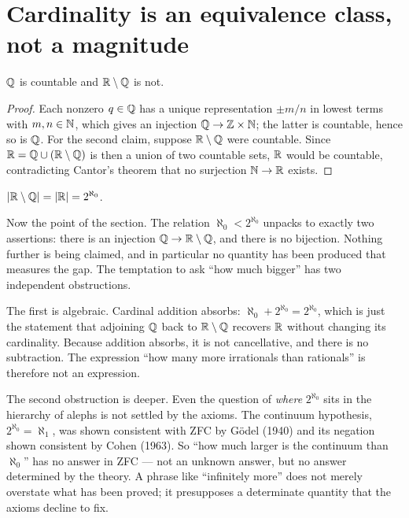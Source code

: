 \documentclass{essay}
\newcommand{\Irr}{\R \setminus \Q}
\begin{document}
\section{Cardinality is an equivalence class, not a magnitude}
\label{sec:card}

\begin{theorem}
  \(\mathbb{Q}\) is countable and \(\Irr\) is not.
\end{theorem}

\begin{proof}
  Each nonzero \(q \in \mathbb{Q}\) has a unique representation \(\pm m/n\) in lowest
  terms with \(m, n \in \mathbb{N}\), which gives an injection \(\mathbb{Q} \to \mathbb{Z} \times
  \mathbb{N}\); the latter is countable, hence so is \(\mathbb{Q}\). For the second claim,
  suppose \(\Irr\) were countable. Since \(\R = \Q \cup (\Irr)\) is then a
  union of two countable sets, \(\mathbb{R}\) would be countable, contradicting
  Cantor's theorem that no surjection \(\mathbb{N} \to \mathbb{R}\) exists.
\end{proof}

\begin{corollary}
  \(|\Irr| = |\R| = 2^{\aleph_{0}}\).
\end{corollary}

Now the point of the section. The relation \(\aleph_{0} < 2^{\aleph_{0}}\)
unpacks to exactly two assertions: there is an injection \(\Q \to \Irr\),
and there is no bijection. Nothing further is being claimed, and in
particular no quantity has been produced that measures the gap. The
temptation to ask ``how much bigger'' has two independent obstructions.

The first is algebraic. Cardinal addition absorbs: \(\aleph_{0} +
2^{\aleph_{0}} = 2^{\aleph_{0}}\), which is just the statement that
adjoining \(\mathbb{Q}\) back to \(\Irr\) recovers \(\mathbb{R}\) without changing its
cardinality. Because addition absorbs, it is not cancellative, and
there is no subtraction. The expression ``how many more irrationals
than rationals'' is therefore not an expression.

The second obstruction is deeper. Even the question of \emph{where}
\(2^{\aleph_{0}}\) sits in the hierarchy of alephs is not settled by the
axioms. The continuum hypothesis, \(2^{\aleph_{0}} = \aleph_{1}\), was shown
consistent with ZFC by G\"odel (1940) and its negation shown consistent
by Cohen (1963). So ``how much larger is the continuum than
\(\aleph_{0}\)'' has no answer in ZFC --- not an unknown answer, but no
answer determined by the theory. A phrase like ``infinitely more'' does
not merely overstate what has been proved; it presupposes a
determinate quantity that the axioms decline to fix.
\end{document}
